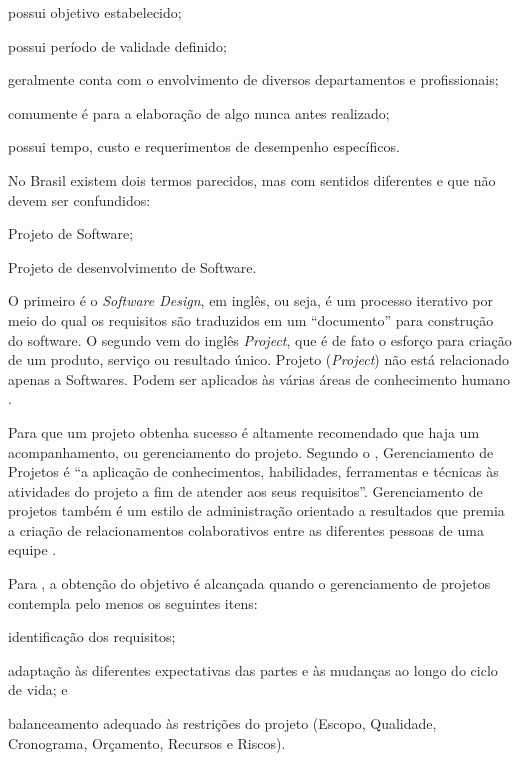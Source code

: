 \documentclass[
    12pt,               %
    openright,          %
    twoside,            %
    a4paper,            %
    chapter=TITLE,     %
    english,            %
    spanish,            %
    portuguese              %
    ]{abntex2}
\newcommand\dblquote[1]{\textquotedblleft #1\textquotedblright}
\begin{document}
\begin{alineas}
	\item possui objetivo estabelecido;
	\item possui período de validade definido;
	\item geralmente conta com o envolvimento de diversos departamentos e profissionais;
	\item comumente é para a elaboração de algo nunca antes realizado;
	\item possui tempo, custo e requerimentos de desempenho específicos.
\end{alineas}

No Brasil existem dois termos parecidos, mas com sentidos diferentes e que não devem ser confundidos:

\begin{alineas}
	\item Projeto de Software;
	\item Projeto de desenvolvimento de Software.
\end{alineas}

O primeiro é o \textit{Software Design}, em inglês, ou seja, é um processo iterativo por meio do qual os requisitos são traduzidos em um \dblquote{documento} para construção do software. O segundo vem do inglês \textit{Project}, que é de fato o esforço para criação de um produto, serviço ou resultado único. Projeto (\textit{Project}) não está relacionado apenas a Softwares. Podem ser aplicados às várias áreas de conhecimento humano \cite{pressman2006}.

Para que um projeto obtenha sucesso é altamente recomendado que haja um acompanhamento, ou gerenciamento do projeto. Segundo o , Gerenciamento de Projetos é \dblquote{a aplicação de conhecimentos, habilidades, ferramentas e técnicas às atividades do projeto a fim de atender aos seus requisitos}. Gerenciamento de projetos também é um estilo de administração orientado a resultados que premia a criação de relacionamentos colaborativos entre as diferentes pessoas de uma equipe \cite[p.~3]{grayLarson2009}.

Para , a obtenção do objetivo é alcançada quando o gerenciamento de projetos contempla pelo menos os seguintes itens:

\begin{alineas}
	\item identificação dos requisitos;
	\item adaptação às diferentes expectativas das partes e às mudanças ao longo do ciclo de vida; e
	\item balanceamento adequado às restrições do projeto (Escopo, Qualidade, Cronograma, Orçamento, Recursos e Riscos).
\end{alineas}
\end{document}
